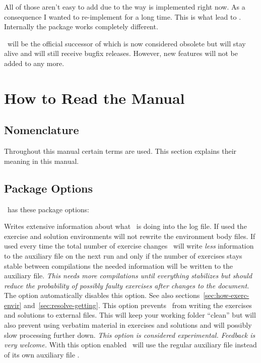 \documentclass{xsim-manual}
\begin{document}
All of those aren't easy to add due to the way  is implemented
right now. As a consequence I wanted to re-implement  for a long
time.  This is what lead to \xsim.  Internally the package works completely
different.

\begin{bewareofthedog}
  \xsim\ will be the official successor of  which is now
  considered obsolete but will stay alive and will still receive bugfix
  releases. However, new features will not be added to  any
  more.
\end{bewareofthedog}

\section{How to Read the Manual}\label{sec:how-read-manual}

\subsection{Nomenclature}

Throughout this manual certain terms are used.  This section explains their
meaning in this manual.

\acuseall
\printacronyms[heading=none]

\subsection{Package Options}\label{sec:package-options}
\xsim\ has these package options:
\begin{options}
    Writes extensive information about what \xsim\ is doing into the log
    file.
    If used the exercise and solution environments will not rewrite the
    environment body files.
    If used every time the  total number of exercise changes \xsim\ will write
    \emph{less} information to the auxiliary file on the next run and only if
    the number of exercises stays stable between compilations the needed
    information will be written to the auxiliary file. \emph{This needs more
      compilations until everything stabilizes but should reduce the
      probability of possibly faulty exercises after changes to the document.}
    The  option automatically disables this option.  See also
    sections~\vref{sec:how-exerc-envir} and~\vref{sec:resolve-getting}.
    This option prevents \xsim\ from writing the exercises
    and solutions to external files.  This will keep your working folder
    ``clean'' but will also prevent using verbatim material in exercises and
    solutions and will possibly slow processing further down.  \emph{This
      option is considered experimental.  Feedback is very welcome.}
    With this option enabled \xsim\ will use the regular
    auxiliary file  instead of its own auxiliary file
    .
\end{options}
\end{document}
